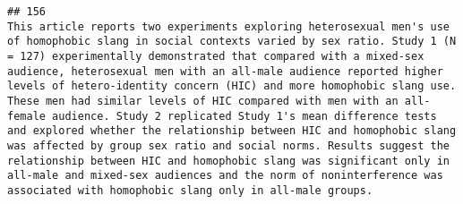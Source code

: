\documentclass[
  english,
  man]{apa6}
\begin{document}
\begin{verbatim}
## 156                                                                                                                                                                                                                                                                                                                                                                                                                                                                                                                                                                                                                                                                                                                                                                                                                                                                                                                                                                                                                                                                                                                                                                                                                                                                                                                                                                                                                                                                                                                                                                                                                                                                                                                                                                                                                       This article reports two experiments exploring heterosexual men's use of homophobic slang in social contexts varied by sex ratio. Study 1 (N = 127) experimentally demonstrated that compared with a mixed-sex audience, heterosexual men with an all-male audience reported higher levels of hetero-identity concern (HIC) and more homophobic slang use. These men had similar levels of HIC compared with men with an all-female audience. Study 2 replicated Study 1's mean difference tests and explored whether the relationship between HIC and homophobic slang was affected by group sex ratio and social norms. Results suggest the relationship between HIC and homophobic slang was significant only in all-male and mixed-sex audiences and the norm of noninterference was associated with homophobic slang only in all-male groups.

\end{verbatim}
\end{document}
